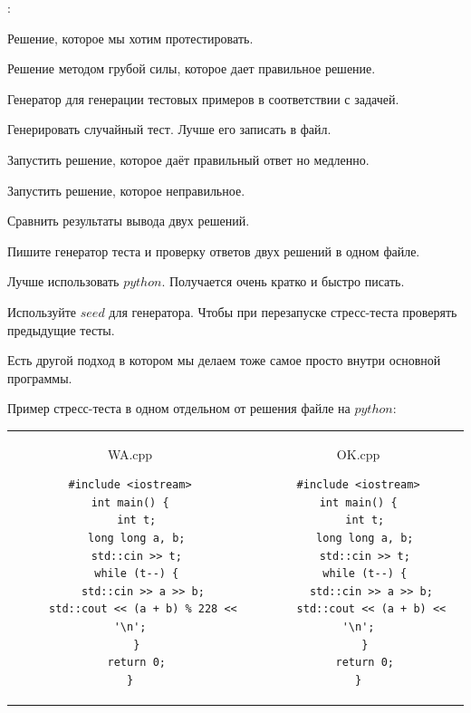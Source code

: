 :
\up
\begin{MyList}[0pt]
	\item Решение, которое мы хотим протестировать.
	\item Решение методом грубой силы, которое дает правильное решение.
	\item Генератор для генерации тестовых примеров в соответствии с задачей.
\end{MyList} \up \up


\up \up
\begin{MyList}[0pt]
	\item Генерировать случайный тест. Лучше его записать в файл.
	\item Запустить решение, которое даёт правильный ответ но медленно.
	\item Запустить решение, которое неправильное.
	\item Сравнить результаты вывода двух решений.
\end{MyList} \up \up


\up \up
\begin{MyList}[0pt]
	\item Пишите генератор теста и проверку ответов двух решений в одном файле.
	\item Лучше использовать $python$. Получается очень кратко и быстро писать.
	\item Используйте $seed$ для генератора. Чтобы при перезапуске стресс-теста проверять предыдущие тесты. 
\end{MyList}

Есть другой подход в котором мы делаем тоже самое просто внутри основной программы.

Пример стресс-теста в одном отдельном от решения файле на $python$:

\down

\begin{tabular}{cc}
	\begin{minipage}{9cm}
		WA.cpp
		\begin{verbatim}
#include <iostream>
int main() {
  int t;
  long long a, b;
  std::cin >> t;
  while (t--) {
    std::cin >> a >> b;
    std::cout << (a + b) % 228 << '\n';
  }
  return 0;
}
		\end{verbatim}
	\end{minipage} 
	&
	\begin{minipage}{8cm}
		OK.cpp
		\begin{verbatim}
#include <iostream>
int main() {
  int t;
  long long a, b;
  std::cin >> t;
  while (t--) {
    std::cin >> a >> b;
    std::cout << (a + b) << '\n';
  }
  return 0;
}
		\end{verbatim}
	\end{minipage} 
\end{tabular}

